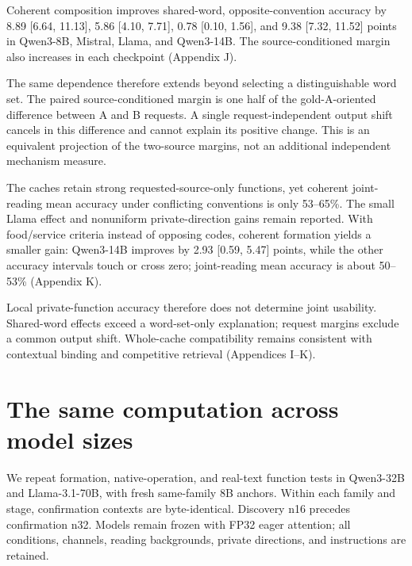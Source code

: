 \documentclass[11pt]{article}
\begin{document}
Coherent composition improves shared-word, opposite-convention accuracy by 8.89 {[}6.64, 11.13{]}, 5.86 {[}4.10, 7.71{]}, 0.78 {[}0.10, 1.56{]}, and 9.38 {[}7.32, 11.52{]} points in Qwen3-8B, Mistral, Llama, and Qwen3-14B. The source-conditioned margin also increases in each checkpoint (Appendix J).

The same dependence therefore extends beyond selecting a distinguishable word set. The paired source-conditioned margin is one half of the gold-A-oriented difference between A and B requests. A single request-independent output shift cancels in this difference and cannot explain its positive change. This is an equivalent projection of the two-source margins, not an additional independent mechanism measure.

The caches retain strong requested-source-only functions, yet coherent joint-reading mean accuracy under conflicting conventions is only 53--65\%. The small Llama effect and nonuniform private-direction gains remain reported. With food/service criteria instead of opposing codes, coherent formation yields a smaller gain: Qwen3-14B improves by 2.93 {[}0.59, 5.47{]} points, while the other accuracy intervals touch or cross zero; joint-reading mean accuracy is about 50--53\% (Appendix K).

Local private-function accuracy therefore does not determine joint usability. Shared-word effects exceed a word-set-only explanation; request margins exclude a common output shift. Whole-cache compatibility remains consistent with contextual binding and competitive retrieval (Appendices I--K).

\section{The same computation across model sizes}\label{the-same-computation-across-model-sizes}

We repeat formation, native-operation, and real-text function tests in Qwen3-32B and Llama-3.1-70B, with fresh same-family 8B anchors. Within each family and stage, confirmation contexts are byte-identical. Discovery n16 precedes confirmation n32. Models remain frozen with FP32 eager attention; all conditions, channels, reading backgrounds, private directions, and instructions are retained.
\end{document}
